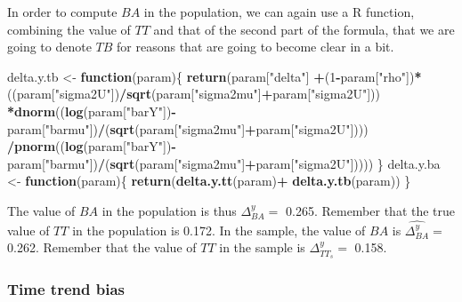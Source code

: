\documentclass[]{book}
\newenvironment{Shaded}{\begin{snugshade}}{\end{snugshade}}
\newcommand{\KeywordTok}[1]{\textcolor[rgb]{0.13,0.29,0.53}{\textbf{#1}}}
\newcommand{\DecValTok}[1]{\textcolor[rgb]{0.00,0.00,0.81}{#1}}
\newcommand{\StringTok}[1]{\textcolor[rgb]{0.31,0.60,0.02}{#1}}
\newcommand{\ControlFlowTok}[1]{\textcolor[rgb]{0.13,0.29,0.53}{\textbf{#1}}}
\newcommand{\OperatorTok}[1]{\textcolor[rgb]{0.81,0.36,0.00}{\textbf{#1}}}
\newcommand{\NormalTok}[1]{#1}
\theoremstyle{definition}
\theoremstyle{definition}
\theoremstyle{definition}
\theoremstyle{remark}
\begin{document}
In order to compute \(BA\) in the population, we can again use a R
function, combining the value of \(TT\) and that of the second part of
the formula, that we are going to denote \(TB\) for reasons that are
going to become clear in a bit.

\begin{Shaded}
\begin{Highlighting}[]
\NormalTok{delta.y.tb <-}\StringTok{ }\ControlFlowTok{function}\NormalTok{(param)\{}
  \KeywordTok{return}\NormalTok{(param[}\StringTok{"delta"}\NormalTok{]}
          \OperatorTok{+}\NormalTok{(}\DecValTok{1}\OperatorTok{-}\NormalTok{param[}\StringTok{"rho"}\NormalTok{])}\OperatorTok{*}\NormalTok{((param[}\StringTok{"sigma2U"}\NormalTok{])}\OperatorTok{/}\KeywordTok{sqrt}\NormalTok{(param[}\StringTok{"sigma2mu"}\NormalTok{]}\OperatorTok{+}\NormalTok{param[}\StringTok{"sigma2U"}\NormalTok{]))}
         \OperatorTok{*}\KeywordTok{dnorm}\NormalTok{((}\KeywordTok{log}\NormalTok{(param[}\StringTok{"barY"}\NormalTok{])}\OperatorTok{-}\NormalTok{param[}\StringTok{"barmu"}\NormalTok{])}\OperatorTok{/}\NormalTok{(}\KeywordTok{sqrt}\NormalTok{(param[}\StringTok{"sigma2mu"}\NormalTok{]}\OperatorTok{+}\NormalTok{param[}\StringTok{"sigma2U"}\NormalTok{])))}
         \OperatorTok{/}\KeywordTok{pnorm}\NormalTok{((}\KeywordTok{log}\NormalTok{(param[}\StringTok{"barY"}\NormalTok{])}\OperatorTok{-}\NormalTok{param[}\StringTok{"barmu"}\NormalTok{])}\OperatorTok{/}\NormalTok{(}\KeywordTok{sqrt}\NormalTok{(param[}\StringTok{"sigma2mu"}\NormalTok{]}\OperatorTok{+}\NormalTok{param[}\StringTok{"sigma2U"}\NormalTok{]))))}
\NormalTok{\}}
\NormalTok{delta.y.ba <-}\StringTok{ }\ControlFlowTok{function}\NormalTok{(param)\{}
  \KeywordTok{return}\NormalTok{(}\KeywordTok{delta.y.tt}\NormalTok{(param)}\OperatorTok{+}\StringTok{ }\KeywordTok{delta.y.tb}\NormalTok{(param))}
\NormalTok{\}}
\end{Highlighting}
\end{Shaded}

The value of \(BA\) in the population is thus \(\Delta^y_{BA}=\) 0.265.
Remember that the true value of \(TT\) in the population is 0.172. In
the sample, the value of \(BA\) is \(\hat{\Delta^y_{BA}}=\) 0.262.
Remember that the value of \(TT\) in the sample is \(\Delta^y_{TT_s}=\)
0.158.

\subsubsection{Time trend bias}\label{time-trend-bias}
\end{document}
